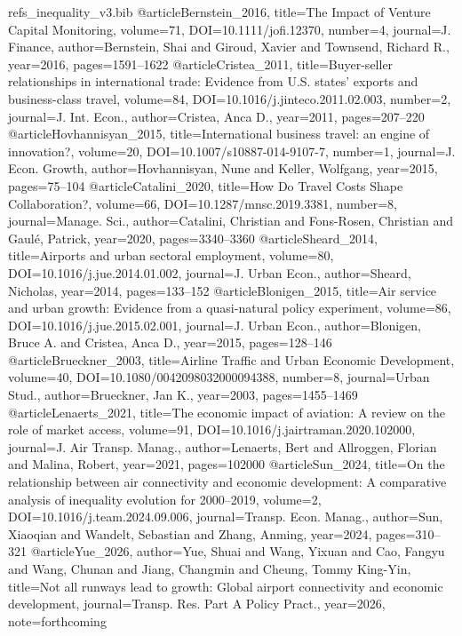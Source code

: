 \begin{filecontents*}[overwrite]{refs_inequality_v3.bib}
@article{Bernstein_2016, title={The Impact of Venture Capital Monitoring}, volume={71}, DOI={10.1111/jofi.12370}, number={4}, journal={J. Finance}, author={Bernstein, Shai and Giroud, Xavier and Townsend, Richard R.}, year={2016}, pages={1591--1622} }
@article{Cristea_2011, title={Buyer-seller relationships in international trade: Evidence from {U.S.} states' exports and business-class travel}, volume={84}, DOI={10.1016/j.jinteco.2011.02.003}, number={2}, journal={J. Int. Econ.}, author={Cristea, Anca D.}, year={2011}, pages={207--220} }
@article{Hovhannisyan_2015, title={International business travel: an engine of innovation?}, volume={20}, DOI={10.1007/s10887-014-9107-7}, number={1}, journal={J. Econ. Growth}, author={Hovhannisyan, Nune and Keller, Wolfgang}, year={2015}, pages={75--104} }
@article{Catalini_2020, title={How Do Travel Costs Shape Collaboration?}, volume={66}, DOI={10.1287/mnsc.2019.3381}, number={8}, journal={Manage. Sci.}, author={Catalini, Christian and Fons-Rosen, Christian and Gaul\'e, Patrick}, year={2020}, pages={3340--3360} }
@article{Sheard_2014, title={Airports and urban sectoral employment}, volume={80}, DOI={10.1016/j.jue.2014.01.002}, journal={J. Urban Econ.}, author={Sheard, Nicholas}, year={2014}, pages={133--152} }
@article{Blonigen_2015, title={Air service and urban growth: Evidence from a quasi-natural policy experiment}, volume={86}, DOI={10.1016/j.jue.2015.02.001}, journal={J. Urban Econ.}, author={Blonigen, Bruce A. and Cristea, Anca D.}, year={2015}, pages={128--146} }
@article{Brueckner_2003, title={Airline Traffic and Urban Economic Development}, volume={40}, DOI={10.1080/0042098032000094388}, number={8}, journal={Urban Stud.}, author={Brueckner, Jan K.}, year={2003}, pages={1455--1469} }
@article{Lenaerts_2021, title={The economic impact of aviation: A review on the role of market access}, volume={91}, DOI={10.1016/j.jairtraman.2020.102000}, journal={J. Air Transp. Manag.}, author={Lenaerts, Bert and Allroggen, Florian and Malina, Robert}, year={2021}, pages={102000} }
@article{Sun_2024, title={On the relationship between air connectivity and economic development: A comparative analysis of inequality evolution for 2000--2019}, volume={2}, DOI={10.1016/j.team.2024.09.006}, journal={Transp. Econ. Manag.}, author={Sun, Xiaoqian and Wandelt, Sebastian and Zhang, Anming}, year={2024}, pages={310--321} }
@article{Yue_2026, author={Yue, Shuai and Wang, Yixuan and Cao, Fangyu and Wang, Chunan and Jiang, Changmin and Cheung, Tommy King-Yin}, title={Not all runways lead to growth: Global airport connectivity and economic development}, journal={Transp. Res. Part A Policy Pract.}, year={2026}, note={forthcoming} }

\end{filecontents*}
